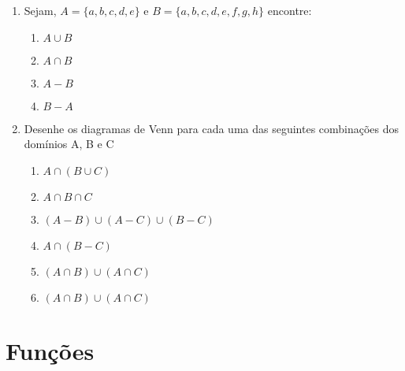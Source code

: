 \begin{enumerate}
	\item Sejam, $A = \{a, b, c, d, e\}$ e $B = \{a, b, c, d, e, f, g, h\}$ encontre:
	\begin{enumerate}
	  \item $A \cup B$ \item $A \cap B$ \item $A - B$ \item $B - A$ 
	\end{enumerate}
	
	\item Desenhe os diagramas de Venn para cada uma das seguintes combinações dos domínios A, B e C
	\begin{enumerate}
		\item $A \cap (B \cup C)$ \item $A \cap B \cap C$ \item $(A - B) \cup (A - C) \cup (B - C)$ 
		\item $A \cap (B - C)$ \item $(A \cap B) \cup (A \cap C)$ \item $(A \cap B) \cup (A \cap C)$
	\end{enumerate}
\end{enumerate}

\section*{Funções}

